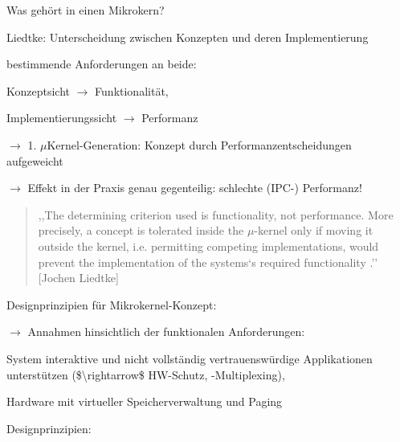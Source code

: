 \documentclass[a4paper]{article}
\begin{document}
\begin{multicols}{3}
    \begin{itemize*}
        \item
        Was gehört in einen Mikrokern?
        \begin{itemize*}
            \item Liedtke: Unterscheidung zwischen Konzepten und deren Implementierung
            \item bestimmende Anforderungen an beide: \begin{itemize*} \item   Konzeptsicht $\rightarrow$  Funktionalität, \item   Implementierungssicht $\rightarrow$  Performanz \end{itemize*}
            \item $\rightarrow$  1. $\mu$Kernel-Generation: Konzept durch Performanzentscheidungen aufgeweicht
            \item $\rightarrow$  Effekt in der Praxis genau gegenteilig: schlechte (IPC-) Performanz!
        \end{itemize*}
    \end{itemize*}

    \begin{quote}
        ,,The determining criterion used is functionality, not performance. More
        precisely, a concept is tolerated inside the $\mu$-kernel only if moving it
        outside the kernel, i.e. permitting competing implementations, would
        prevent the implementation of the systems`s required functionality .''
        {[}Jochen Liedtke{]}
    \end{quote}

    Designprinzipien für Mikrokernel-Konzept:

    \begin{itemize*}
        \item
        $\rightarrow$  Annahmen hinsichtlich der funktionalen
        Anforderungen:
    \end{itemize*}

    \begin{enumerate*}
        \item
        System interaktive und nicht vollständig vertrauenswürdige
        Applikationen unterstützen (\$\textbackslash rightarrow\$ HW-Schutz,
        -Multiplexing),
        \item
        Hardware mit virtueller Speicherverwaltung und Paging
    \end{enumerate*}

    Designprinzipien:


\end{multicols}
\end{document}
